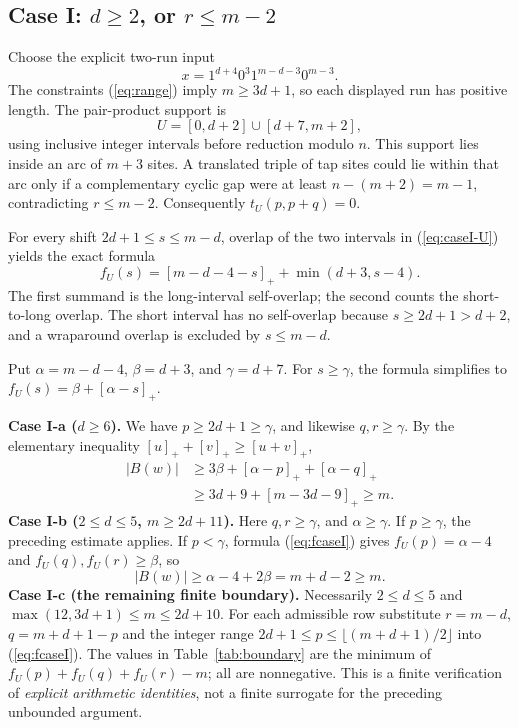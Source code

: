 \documentclass[11pt,a4paper]{article}
\newcommand{\wt}[1]{\lvert #1\rvert}
\newcommand{\pos}[1]{[#1]_{+}}
\begin{document}
\subsection{Case I: $d\ge2$, or $r\le m-2$}
Choose the explicit two-run input
\begin{equation}\label{eq:caseI-x}
 x=1^{d+4}0^3 1^{m-d-3}0^{m-3}.
\end{equation}
The constraints (\ref{eq:range}) imply $m\ge3d+1$, so each displayed run has positive length. The pair-product support is
\begin{equation}\label{eq:caseI-U}
 U=[0,d+2]\cup[d+7,m+2],
\end{equation}
using inclusive integer intervals before reduction modulo $n$. This support lies inside an arc of $m+3$ sites. A translated triple of tap sites could lie within that arc only if a complementary cyclic gap were at least $n-(m+2)=m-1$, contradicting $r\le m-2$. Consequently $t_U(p,p+q)=0$.

For every shift $2d+1\le s\le m-d$, overlap of the two intervals in (\ref{eq:caseI-U}) yields the exact formula
\begin{equation}\label{eq:fcaseI}
 f_U(s)=\pos{m-d-4-s}+\min(d+3,s-4).
\end{equation}
The first summand is the long-interval self-overlap; the second counts the short-to-long overlap. The short interval has no self-overlap because $s\ge2d+1>d+2$, and a wraparound overlap is excluded by $s\le m-d$.

Put $\alpha=m-d-4$, $\beta=d+3$, and $\gamma=d+7$. For $s\ge\gamma$, the formula simplifies to $f_U(s)=\beta+\pos{\alpha-s}$.

\textbf{Case I-a ($d\ge6$).} We have $p\ge2d+1\ge\gamma$, and likewise $q,r\ge\gamma$. By the elementary inequality $\pos{u}+\pos{v}\ge\pos{u+v}$,
\begin{align*}
\wt{B(w)}&\ge3\beta+\pos{\alpha-p}+\pos{\alpha-q}\\
 &\ge3d+9+\pos{m-3d-9}\ge m.
\end{align*}
\textbf{Case I-b ($2\le d\le5$, $m\ge2d+11$).} Here $q,r\ge\gamma$, and $\alpha\ge\gamma$. If $p\ge\gamma$, the preceding estimate applies. If $p<\gamma$, formula (\ref{eq:fcaseI}) gives $f_U(p)=\alpha-4$ and $f_U(q),f_U(r)\ge\beta$, so
\[
\wt{B(w)}\ge\alpha-4+2\beta=m+d-2\ge m.
\]
\textbf{Case I-c (the remaining finite boundary).} Necessarily $2\le d\le5$ and $\max(12,3d+1)\le m\le2d+10$. For each admissible row substitute $r=m-d$, $q=m+d+1-p$ and the integer range $2d+1\le p\le\lfloor(m+d+1)/2\rfloor$ into (\ref{eq:fcaseI}). The values in Table~\ref{tab:boundary} are the minimum of $f_U(p)+f_U(q)+f_U(r)-m$; all are nonnegative. This is a finite verification of \emph{explicit arithmetic identities}, not a finite surrogate for the preceding unbounded argument.
\end{document}
